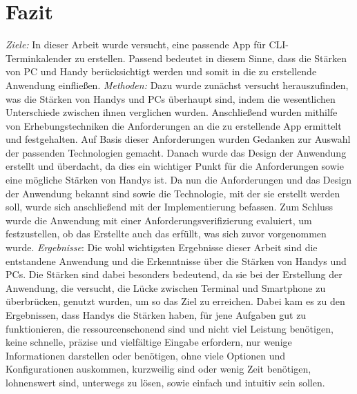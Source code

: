 \section{Fazit}\label{section:fazit}


	\textit{Ziele:} In dieser Arbeit wurde versucht, eine passende App für CLI-Terminkalender zu erstellen. \glqq Passend\grqq{} bedeutet in diesem Sinne, dass die Stärken von PC und Handy berücksichtigt werden und somit in die zu erstellende Anwendung einfließen.
	\newline%
	\myNewSection
	\textit{Methoden:} Dazu wurde zunächst versucht herauszufinden, was die Stärken von Handys und PCs überhaupt sind, indem die wesentlichen Unterschiede zwischen ihnen verglichen wurden.
	Anschließend wurden mithilfe von Erhebungstechniken die Anforderungen an die zu erstellende App ermittelt und festgehalten.
	Auf Basis dieser Anforderungen wurden Gedanken zur Auswahl der passenden Technologien gemacht. 
	Danach wurde das Design der Anwendung erstellt und überdacht, da dies ein wichtiger Punkt für die Anforderungen sowie eine mögliche Stärken von Handys ist.
	Da nun die Anforderungen und das Design der Anwendung bekannt sind sowie die Technologie, mit der sie erstellt werden soll, wurde sich anschließend mit der Implementierung befassen.
	Zum Schluss wurde die Anwendung mit einer Anforderungsverifizierung evaluiert, um festzustellen, ob das Erstellte auch das erfüllt, was sich zuvor vorgenommen wurde.
\newline%
\myNewSection
\textit{Ergebnisse}:
Die wohl wichtigsten Ergebnisse dieser Arbeit sind die entstandene Anwendung und die Erkenntnisse über die Stärken von Handys und PCs. 
	\newline
	Die Stärken sind dabei besonders bedeutend, da sie bei der Erstellung der Anwendung, die versucht, die Lücke zwischen Terminal und Smartphone zu überbrücken, genutzt wurden, um so das Ziel zu erreichen.
		Dabei kam es zu den Ergebnissen, dass Handys die Stärken haben, für jene Aufgaben gut zu funktionieren, die ressourcenschonend sind und nicht viel Leistung benötigen, keine schnelle, präzise und vielfältige Eingabe erfordern, nur wenige Informationen darstellen oder benötigen, ohne viele Optionen und Konfigurationen auskommen, kurzweilig sind oder wenig Zeit benötigen, lohnenswert sind, unterwegs zu lösen, sowie einfach und intuitiv sein sollen. 
